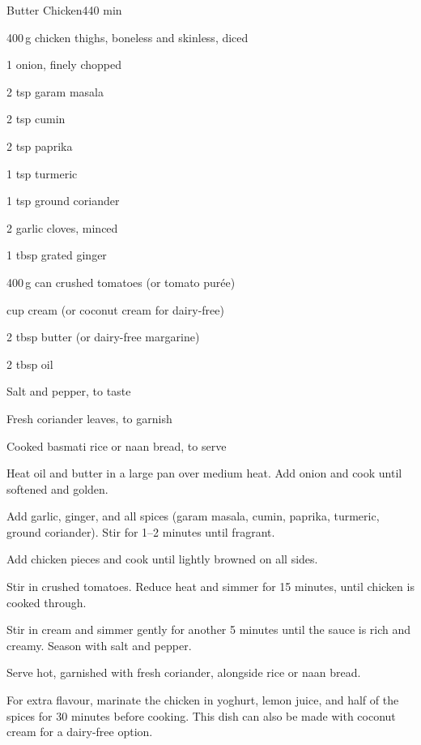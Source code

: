 \begin{recipebox}{Butter Chicken}{4}{40 min}
\begin{ingredients}
  \item 400\,g chicken thighs, boneless and skinless, diced
  \item 1 onion, finely chopped
  \item 2 tsp garam masala
  \item 2 tsp cumin
  \item 2 tsp paprika
  \item 1 tsp turmeric
  \item 1 tsp ground coriander
  \item 2 garlic cloves, minced
  \item 1 tbsp grated ginger
  \item 400\,g can crushed tomatoes (or tomato purée)
  \item {} cup cream (or coconut cream for dairy-free)
  \item 2 tbsp butter (or dairy-free margarine)
  \item 2 tbsp oil
  \item Salt and pepper, to taste
  \item Fresh coriander leaves, to garnish
  \item Cooked basmati rice or naan bread, to serve
\end{ingredients}

\begin{method}
  \item Heat oil and butter in a large pan over medium heat. Add onion and cook until softened and golden.  
  \item Add garlic, ginger, and all spices (garam masala, cumin, paprika, turmeric, ground coriander). Stir for 1–2 minutes until fragrant.  
  \item Add chicken pieces and cook until lightly browned on all sides.  
  \item Stir in crushed tomatoes. Reduce heat and simmer for 15 minutes, until chicken is cooked through.  
  \item Stir in cream and simmer gently for another 5 minutes until the sauce is rich and creamy. Season with salt and pepper.  
  \item Serve hot, garnished with fresh coriander, alongside rice or naan bread.  
\end{method}

\begin{notes}
For extra flavour, marinate the chicken in yoghurt, lemon juice, and half of the spices for 30 minutes before cooking.  
This dish can also be made with coconut cream for a dairy-free option.  
\end{notes}
\end{recipebox}